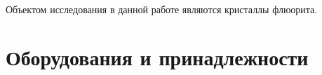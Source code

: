 Объектом исследования в данной работе  являются кристаллы флюорита.




%

\section{Оборудования и принадлежности}\label{sec:stuff}
